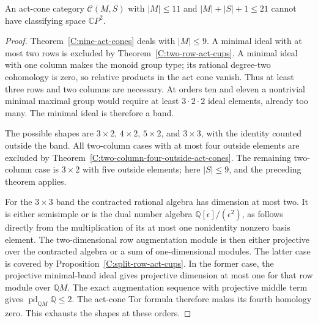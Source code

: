 \begin{corollary}
\label{C:eleven-act-cones21}
An act-cone category $\mathcal C(M,S)$ with $|M|\leq11$ and
$|M|+|S|+1\leq21$ cannot have classifying space
$\mathbb CP^2$.
\end{corollary}
\begin{proof}
Theorem~\ref{C:nine-act-cones} deals with $|M|\leq9$.
A minimal ideal with at most two rows is excluded by
Theorem~\ref{C:two-row-act-cups}.  A minimal ideal with one
column makes the monoid group type; its rational degree-two
cohomology is zero, so relative products in the act cone vanish.
Thus at least three rows and two columns are necessary.
At orders ten and eleven a nontrivial minimal maximal group
would require at least $3\cdot2\cdot2$ ideal elements, already
too many.  The minimal ideal is therefore a band.

The possible shapes are $3\times2$, $4\times2$, $5\times2$,
and $3\times3$, with the identity counted outside the band.
All two-column cases with at most four outside elements are
excluded by Theorem~\ref{C:two-column-four-outside-act-cones}.
The remaining two-column case is $3\times2$ with five outside
elements; here $|S|\leq9$, and the preceding theorem applies.

For the $3\times3$ band the contracted rational algebra has
dimension at most two.  It is either semisimple or is the dual
number algebra $\mathbb Q[\epsilon]/(\epsilon^2)$, as follows
directly from the multiplication of its at most one nonidentity
nonzero basis element.  The two-dimensional row augmentation
module is then either projective over the contracted algebra or
a sum of one-dimensional modules.  The latter case is covered
by Proposition~\ref{C:split-row-act-cups}.  In the former case,
the projective minimal-band ideal gives projective dimension at
most one for that row module over $\mathbb QM$.  The exact
augmentation sequence with projective middle term gives
$\operatorname{pd}_{\mathbb QM}\mathbb Q\leq2$.
The act-cone Tor formula therefore makes its fourth homology
zero.  This exhausts the shapes at these orders.
\end{proof}
